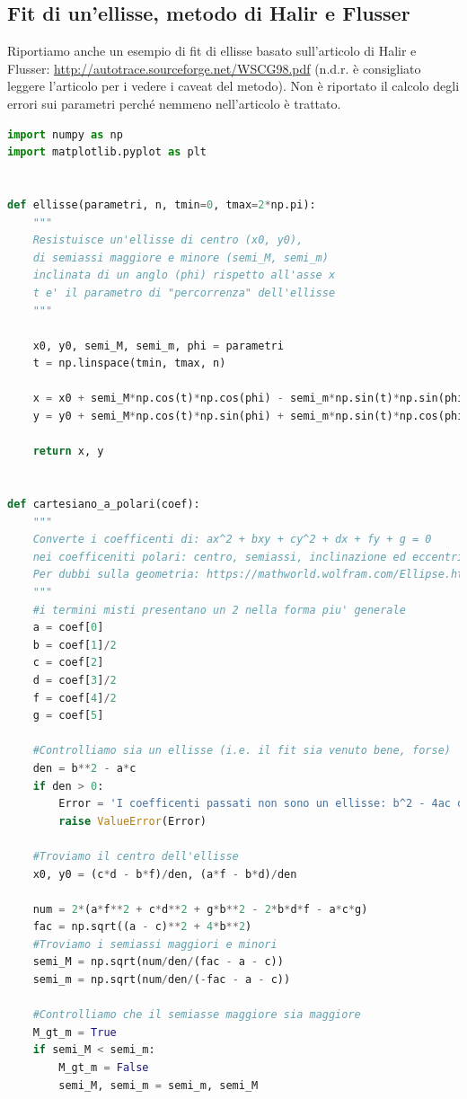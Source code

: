 \documentclass[10pt,a4paper]{article}
\begin{document}
\subsection{Fit di un'ellisse, metodo di  Halir e Flusser}
Riportiamo anche un esempio di fit di ellisse basato sull'articolo di Halir e Flusser:  \url{http://autotrace.sourceforge.net/WSCG98.pdf}
(n.d.r. è consigliato leggere l'articolo per i vedere i caveat del metodo).
Non è riportato il calcolo degli errori sui parametri perché nemmeno nell'articolo è trattato.
\begin{lstlisting}[language=Python]
import numpy as np
import matplotlib.pyplot as plt


def ellisse(parametri, n, tmin=0, tmax=2*np.pi):
    """
    Resistuisce un'ellisse di centro (x0, y0),
    di semiassi maggiore e minore (semi_M, semi_m)
    inclinata di un anglo (phi) rispetto all'asse x
    t e' il parametro di "percorrenza" dell'ellisse
    """

    x0, y0, semi_M, semi_m, phi = parametri
    t = np.linspace(tmin, tmax, n)

    x = x0 + semi_M*np.cos(t)*np.cos(phi) - semi_m*np.sin(t)*np.sin(phi)
    y = y0 + semi_M*np.cos(t)*np.sin(phi) + semi_m*np.sin(t)*np.cos(phi)

    return x, y


def cartesiano_a_polari(coef):
    """
    Converte i coefficenti di: ax^2 + bxy + cy^2 + dx + fy + g = 0
    nei coefficeniti polari: centro, semiassi, inclinazione ed eccentricita'
    Per dubbi sulla geometria: https://mathworld.wolfram.com/Ellipse.html
    """
    #i termini misti presentano un 2 nella forma piu' generale
    a = coef[0]
    b = coef[1]/2
    c = coef[2]
    d = coef[3]/2
    f = coef[4]/2
    g = coef[5]

    #Controlliamo sia un ellisse (i.e. il fit sia venuto bene, forse)
    den = b**2 - a*c
    if den > 0:
        Error = 'I coefficenti passati non sono un ellisse: b^2 - 4ac deve essere negativo'
        raise ValueError(Error)

    #Troviamo il centro dell'ellisse
    x0, y0 = (c*d - b*f)/den, (a*f - b*d)/den

    num = 2*(a*f**2 + c*d**2 + g*b**2 - 2*b*d*f - a*c*g)
    fac = np.sqrt((a - c)**2 + 4*b**2)
    #Troviamo i semiassi maggiori e minori
    semi_M = np.sqrt(num/den/(fac - a - c))
    semi_m = np.sqrt(num/den/(-fac - a - c))

    #Controlliamo che il semiasse maggiore sia maggiore
    M_gt_m = True
    if semi_M < semi_m:
        M_gt_m = False
        semi_M, semi_m = semi_m, semi_M


\end{lstlisting}
\end{document}
